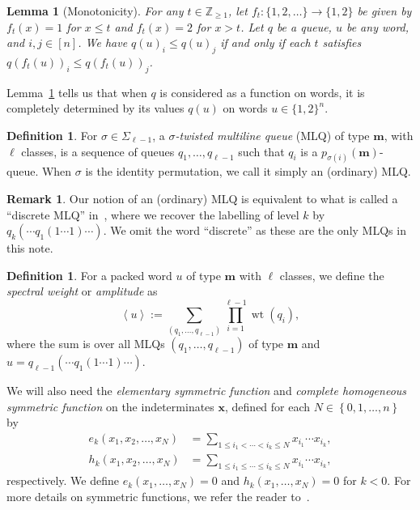 \documentclass[reqno]{amsart}
\newcommand{\0}{\phantom{c}}
\newcommand{\swt}[1]{\left\langle #1 \right\rangle} %
\newcommand{\SymGp}[1]{\Sigma_{#1}} %
\DeclareMathOperator{\wt}{wt} %
\newcommand{\xx}{\mathbf{x}}
\newcommand{\mm}{\mathbf{m}}
\newcommand{\ZZ}{\mathbb{Z}}
\let\sumnonlimits\sum
\let\prodnonlimits\prod
\renewcommand{\sum}{\sumnonlimits\limits}
\renewcommand{\prod}{\prodnonlimits\limits}
\newcommand{\ive}[1]{\left[ #1 \right]}
\newcommand{\defn}[1]{{\color{darkred}\emph{#1}}} %
\theoremstyle{plain}
\newtheorem{lemma}[thm]{Lemma}
\theoremstyle{definition}
\newtheorem{dfn}[thm]{Definition}
\newtheorem{remark}[thm]{Remark}
\numberwithin{equation}{section}
\begin{document}
\begin{lemma}[Monotonicity]
\label{le:mono}
  For any $t \in \ZZ_{\geq 1}$, let $f_t \colon \{1,2, \ldots\} \to \{1,2\}$ be given by $f_t(x) = 1$ for $x \leq t$ and $f_t(x) = 2$ for $x > t$.
  Let $q$ be a queue, $u$ be any word, and $i,j \in \ive{n}$.
  We have $q(u)_i \leq q(u)_j$ if and only if each $t$ satisfies $q(f_t(u))_i \leq q(f_t(u))_j$.
\end{lemma}

Lemma~\ref{le:mono} tells us that when $q$ is considered as a function on words, it is completely determined by its values $q(u)$ on words $u \in \{1,2\}^n$.

\begin{dfn}
For $\sigma \in \SymGp{\ell-1}$, a \defn{$\sigma$-twisted multiline queue} (MLQ) of type $\mm$, with $\ell$ classes, is a sequence of queues $q_1, \dotsc, q_{\ell-1}$ such that $q_i$ is a $p_{\sigma(i)}(\mm)$-queue.
When $\sigma$ is the identity permutation, we call it simply an (ordinary) MLQ.
\end{dfn}

\begin{remark}
Our notion of an (ordinary) MLQ is equivalent to what is called a ``discrete MLQ'' in~\cite[\S 2.2]{AasLin17}, where we recover the labelling of level $k$ by $q_k( \cdots q_1(1 \dotsm 1) \cdots )$.
We omit the word ``discrete'' as these are the only MLQs in this note.
\end{remark}

\begin{dfn}
For a packed word $u$ of type $\mm$ with $\ell$ classes, we define the \defn{spectral weight} or \defn{amplitude} as
\begin{equation}
\label{eq:amplitude}
  \swt{u} := \sum_{(q_1, \dotsc, q_{\ell-1})} \prod_{i=1}^{\ell-1} \wt(q_i),
\end{equation}
where the sum is over all MLQs $(q_1, \dotsc, q_{\ell-1})$ of type $\mm$ and $u = q_{\ell-1}( \cdots q_1(1 \dotsm 1) \cdots )$.
\end{dfn}

We will also need the \defn{elementary symmetric function} and \defn{complete homogeneous symmetric function} on the indeterminates $\xx$,
defined for each $N \in \left\{0,1,\ldots,n\right\}$ by
\begin{align*}
e_k(x_1, x_2, \dotsc, x_N) & = \sum_{1 \leq i_1 < \cdots < i_k \leq N} x_{i_1} \dotsm x_{i_k},
\\ h_k(x_1, x_2, \dotsc, x_N) & = \sum_{1 \leq i_1 \leq \cdots \leq i_k \leq N} x_{i_1} \dotsm x_{i_k},
\end{align*}
respectively.
We define $e_k(x_1, \dotsc, x_N) = 0$ and $h_k(x_1, \dotsc, x_N) = 0$ for $k < 0$.
For more details on symmetric functions, we refer the reader to~\cite[Ch.~7]{Stanley-EC2}.
\end{document}
